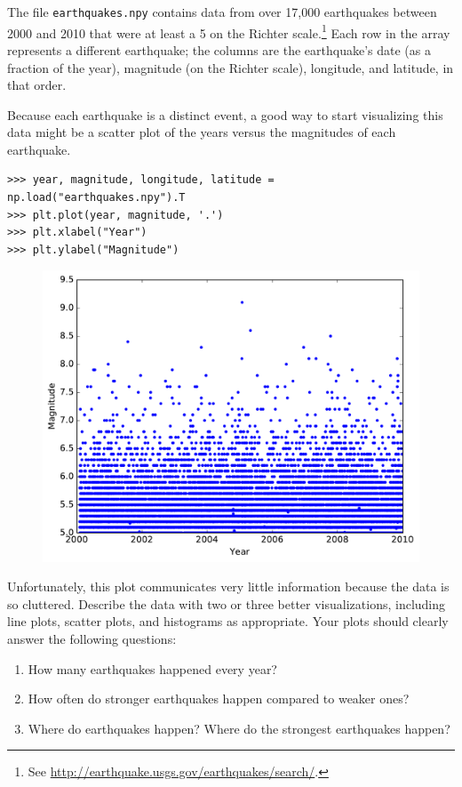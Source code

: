 \begin{problem} %
The file \texttt{earthquakes.npy} contains data from over 17,000 earthquakes between 2000 and 2010 that were at least a 5 on the Richter scale.\footnote{See \url{http://earthquake.usgs.gov/earthquakes/search/}.}
Each row in the array represents a different earthquake;
the columns are the earthquake's date (as a fraction of the year), magnitude (on the Richter scale), longitude, and latitude, in that order.

Because each earthquake is a distinct event, a good way to start visualizing this data might be a scatter plot of the years versus the magnitudes of each earthquake.

\begin{lstlisting}
>>> year, magnitude, longitude, latitude = np.load("earthquakes.npy").T
>>> plt.plot(year, magnitude, '.')
>>> plt.xlabel("Year")
>>> plt.ylabel("Magnitude")
\end{lstlisting}

\begin{figure}[H] %
    \centering
    \includegraphics[width=.7\textwidth]{figures/earthquake.pdf}
\end{figure}

Unfortunately, this plot communicates very little information because the data is so cluttered.
Describe the data with two or three better visualizations, including line plots, scatter plots, and histograms as appropriate.
Your plots should clearly answer the following questions:
\begin{enumerate}
    \item How many earthquakes happened every year?
    \item How often do stronger earthquakes happen compared to weaker ones?
    \item Where do earthquakes happen? Where do the strongest earthquakes happen?
\end{enumerate}
\end{problem}

